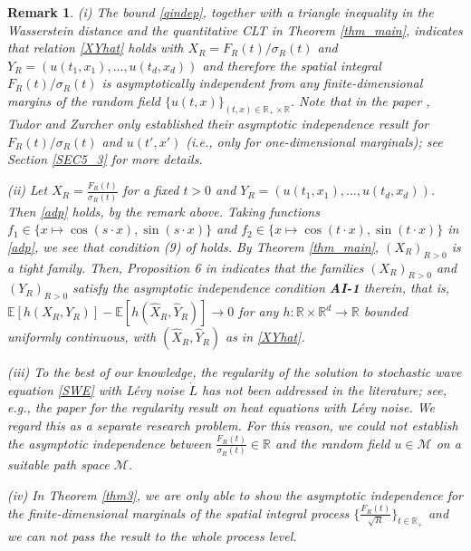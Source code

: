 \documentclass[letterpaper, 11pt,  reqno]{amsart}
\newcommand{\wh}{\widehat}
\newtheorem{remark}[theorem]{Remark}
\newcommand{\noi}{\noindent}
\newcommand{\R}{\mathbb{R}}
\newcommand{\E}{\mathbb{E}}
\newcommand{\s}{\sigma}
\numberwithin{equation}{section}
\numberwithin{theorem}{section}
\begin{document}
\begin{remark}\rm
(i) The bound  \eqref{qindep}, together with a triangle inequality in the 
Wasserstein distance and the quantitative CLT in Theorem \ref{thm_main},
indicates that relation \eqref{XYhat} holds with $X_R=F_R(t)/\s_R(t)$ and $Y_R=(u(t_1,x_1),\ldots,u(t_d,x_d))$ and therefore the spatial integral $F_R(t)/\s_R(t)$ is asymptotically independent
from any finite-dimensional margins of the random field 
$\{u(t,x)\}_{(t,x)\in\R_+\times\R}$. 
Note that in the paper \cite{TZ23}, Tudor and Zurcher only established 
their asymptotic independence result for $F_R(t) / \s_{R}(t)$ and $u(t', x')$ (i.e., 
only for one-dimensional marginals); see Section \ref{SEC5_3} for more details.


 
\smallskip
\noi
(ii) Let $X_R = \frac{F_R(t)}{ \s_{R}(t)}$ for a fixed $t>0$ and
$Y_R=  (u(t_1,x_1),\ldots,u(t_d,x_d) )$. Then \eqref{adp} holds, by the remark above. Taking functions $f_1 \in \{x\mapsto \cos(s \cdot x), \sin(s\cdot x)\}$ and $f_2 \in \{x\mapsto \cos(t \cdot x), \sin( t \cdot x)\}$ in \eqref{adp}, we see that condition (9) of \cite{DN21} holds. By Theorem \ref{thm_main}, $(X_R)_{R>0}$ is a tight family. Then, Proposition 6 in \cite{DN21} indicates that the families $(X_R)_{R>0}$ and $(Y_R)_{R>0}$ satisfy the asymptotic independence condition {\bf AI-1} therein, that is,
$
\E[ h( X_R, Y_R)] - \E[ h( \wh X_R, \wh Y_R)] \to 0
$
for any $h: \R \times\R^{d}\to\R$ bounded uniformly continuous,
with $(\wh X_R, \wh Y_R)$  as  in \eqref{XYhat}.



\smallskip
\noi
(iii) To the best of our knowledge, 
the regularity of the solution to stochastic wave equation \eqref{SWE} 
with L\'evy noise $\dot{L}$ has not been addressed
in the literature; see, e.g., the paper \cite{CDH19} for the regularity result
on heat equations with L\'evy noise. We regard this as a separate 
research problem. 
For this reason, we could not 
establish the asymptotic independence between 
$\tfrac{F_R(t)}{\s_{R}(t)}\in\R$  and the random field $u\in\mathcal{M}$ 
on a suitable path space $\mathcal{M}$.  

\smallskip
\noi
(iv) In Theorem \ref{thm3}, we are only able to show the asymptotic independence 
for the finite-dimensional marginals of the spatial integral process 
$\{\tfrac{F_R(t)}{\sqrt{R} }\}_{t\in\R_+}$ and we can not pass the result 
to the whole process level. 
 


\end{remark}
\end{document}
